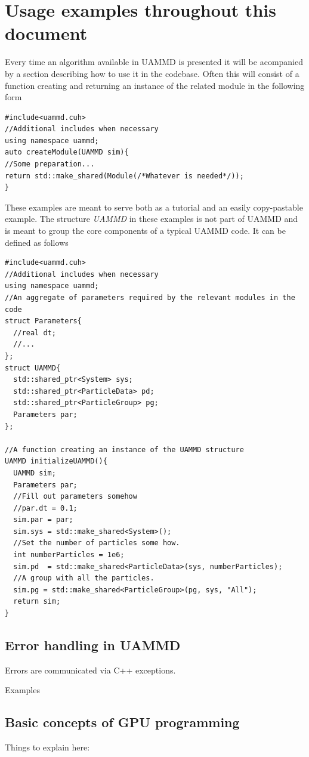 \documentclass[ twoside,openright,titlepage,numbers=noenddot,%
headinclude,footinclude,cleardoublepage=empty,abstract=on,
BCOR=5mm,paper=a4,fontsize=11pt, dvipsnames
]{scrreprt}
\def\ucpp{uammd_cpp_lexer.py:UAMMDCppLexer -x}
\newcommand{\uammd}{\gls{UAMMD}\xspace}
\begin{document}
\chapter{Usage examples throughout this document}\label{sec:uammd_struct}
Every time an algorithm available in \uammd is presented it will be acompanied by a section describing how to use it in the codebase.
Often this will consist of a function creating and returning an instance of the related module in the following form


\begin{verbatim}
#include<uammd.cuh>
//Additional includes when necessary
using namespace uammd;
auto createModule(UAMMD sim){
//Some preparation...
return std::make_shared(Module(/*Whatever is needed*/));
}
\end{verbatim}

These examples are meant to serve both as a tutorial and an easily copy-pastable example.
The structure \emph{UAMMD} in these examples is not part of \uammd and is meant to group the core components of a typical \uammd code. It can be defined as follows


\begin{verbatim}
#include<uammd.cuh>
//Additional includes when necessary
using namespace uammd;
//An aggregate of parameters required by the relevant modules in the code
struct Parameters{
  //real dt;
  //...
};
struct UAMMD{
  std::shared_ptr<System> sys;
  std::shared_ptr<ParticleData> pd;
  std::shared_ptr<ParticleGroup> pg;
  Parameters par;
};

//A function creating an instance of the UAMMD structure
UAMMD initializeUAMMD(){
  UAMMD sim;
  Parameters par;
  //Fill out parameters somehow
  //par.dt = 0.1;
  sim.par = par;
  sim.sys = std::make_shared<System>();
  //Set the number of particles some how.
  int numberParticles = 1e6;
  sim.pd  = std::make_shared<ParticleData>(sys, numberParticles);
  //A group with all the particles.
  sim.pg = std::make_shared<ParticleGroup>(pg, sys, "All");
  return sim;
}
\end{verbatim}

\section{Error handling in UAMMD}\label{sec:uammd_errors}
Errors are communicated via C++ exceptions.

Examples


\section{Basic concepts of GPU programming}
Things to explain here:
\end{document}
